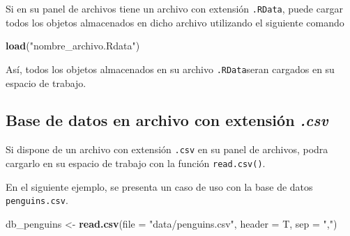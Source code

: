 \documentclass[
]{article}
\newenvironment{Shaded}{\begin{snugshade}}{\end{snugshade}}
\newcommand{\AttributeTok}[1]{\textcolor[rgb]{0.13,0.29,0.53}{#1}}
\newcommand{\FunctionTok}[1]{\textcolor[rgb]{0.13,0.29,0.53}{\textbf{#1}}}
\newcommand{\NormalTok}[1]{#1}
\newcommand{\OtherTok}[1]{\textcolor[rgb]{0.56,0.35,0.01}{#1}}
\newcommand{\StringTok}[1]{\textcolor[rgb]{0.31,0.60,0.02}{#1}}
\begin{document}
Si en su panel de archivos tiene un archivo con extensión
\texttt{.RData}, puede cargar todos los objetos almacenados en dicho
archivo utilizando el siguiente comando

\begin{Shaded}
\begin{Highlighting}[]
\FunctionTok{load}\NormalTok{(}\StringTok{"nombre\_archivo.Rdata"}\NormalTok{)}
\end{Highlighting}
\end{Shaded}

Así, todos los objetos almacenados en su archivo \texttt{.RData}seran
cargados en su espacio de trabajo.

\subsection{\texorpdfstring{Base de datos en archivo con extensión
\emph{.csv}}{Base de datos en archivo con extensión .csv}}\label{base-de-datos-en-archivo-con-extensiuxf3n-.csv}

Si dispone de un archivo con extensión \texttt{.csv} en su panel de
archivos, podra cargarlo en su espacio de trabajo con la función
\texttt{read.csv()}.

En el siguiente ejemplo, se presenta un caso de uso con la base de datos
\texttt{penguins.csv}.

\begin{Shaded}
\begin{Highlighting}[]
\NormalTok{db\_penguins }\OtherTok{\textless{}{-}} \FunctionTok{read.csv}\NormalTok{(}\AttributeTok{file =} \StringTok{"data/penguins.csv"}\NormalTok{,}
                        \AttributeTok{header =}\NormalTok{ T,}
                        \AttributeTok{sep =} \StringTok{","}\NormalTok{)}
\end{Highlighting}
\end{Shaded}
\end{document}
